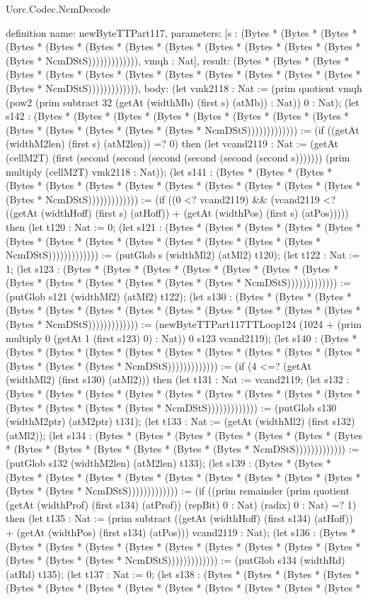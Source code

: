 \begin{lexlean}{Uorc.Codec.NcmDecode}
\begin{semanticmodule}
definition{
  name: newByteTTPart117,
  parameters: [s : (Bytes * (Bytes * (Bytes * (Bytes * (Bytes * (Bytes * (Bytes * (Bytes * (Bytes * (Bytes * (Bytes * (Bytes * (Bytes * NcmDStS))))))))))))), vmqh : Nat],
  result: (Bytes * (Bytes * (Bytes * (Bytes * (Bytes * (Bytes * (Bytes * (Bytes * (Bytes * (Bytes * (Bytes * (Bytes * (Bytes * NcmDStS))))))))))))),
  body: (let vmk2118 : Nat := (prim quotient vmqh (pow2 (prim subtract 32 (getAt (widthMb) (first s) (atMb)) : Nat)) 0 : Nat); (let s142 : (Bytes * (Bytes * (Bytes * (Bytes * (Bytes * (Bytes * (Bytes * (Bytes * (Bytes * (Bytes * (Bytes * (Bytes * (Bytes * NcmDStS))))))))))))) := (if ((getAt (widthM2len) (first s) (atM2len)) =? 0) then (let vcand2119 : Nat := (getAt (cellM2T) (first (second (second (second (second (second (second s))))))) (prim multiply (cellM2T) vmk2118 : Nat)); (let s141 : (Bytes * (Bytes * (Bytes * (Bytes * (Bytes * (Bytes * (Bytes * (Bytes * (Bytes * (Bytes * (Bytes * (Bytes * (Bytes * NcmDStS))))))))))))) := (if ((0 <? vcand2119) && (vcand2119 <? ((getAt (widthHoff) (first s) (atHoff)) + (getAt (widthPos) (first s) (atPos))))) then (let t120 : Nat := 0; (let s121 : (Bytes * (Bytes * (Bytes * (Bytes * (Bytes * (Bytes * (Bytes * (Bytes * (Bytes * (Bytes * (Bytes * (Bytes * (Bytes * NcmDStS))))))))))))) := (putGlob s (widthMl2) (atMl2) t120); (let t122 : Nat := 1; (let s123 : (Bytes * (Bytes * (Bytes * (Bytes * (Bytes * (Bytes * (Bytes * (Bytes * (Bytes * (Bytes * (Bytes * (Bytes * (Bytes * NcmDStS))))))))))))) := (putGlob s121 (widthMf2) (atMf2) t122); (let s130 : (Bytes * (Bytes * (Bytes * (Bytes * (Bytes * (Bytes * (Bytes * (Bytes * (Bytes * (Bytes * (Bytes * (Bytes * (Bytes * NcmDStS))))))))))))) := (newByteTTPart117TTLoop124 (1024 + (prim multiply 0 (getAt 1 (first s123) 0) : Nat)) 0 s123 vcand2119); (let s140 : (Bytes * (Bytes * (Bytes * (Bytes * (Bytes * (Bytes * (Bytes * (Bytes * (Bytes * (Bytes * (Bytes * (Bytes * (Bytes * NcmDStS))))))))))))) := (if (4 <=? (getAt (widthMl2) (first s130) (atMl2))) then (let t131 : Nat := vcand2119; (let s132 : (Bytes * (Bytes * (Bytes * (Bytes * (Bytes * (Bytes * (Bytes * (Bytes * (Bytes * (Bytes * (Bytes * (Bytes * (Bytes * NcmDStS))))))))))))) := (putGlob s130 (widthM2ptr) (atM2ptr) t131); (let t133 : Nat := (getAt (widthMl2) (first s132) (atMl2)); (let s134 : (Bytes * (Bytes * (Bytes * (Bytes * (Bytes * (Bytes * (Bytes * (Bytes * (Bytes * (Bytes * (Bytes * (Bytes * (Bytes * NcmDStS))))))))))))) := (putGlob s132 (widthM2len) (atM2len) t133); (let s139 : (Bytes * (Bytes * (Bytes * (Bytes * (Bytes * (Bytes * (Bytes * (Bytes * (Bytes * (Bytes * (Bytes * (Bytes * (Bytes * NcmDStS))))))))))))) := (if ((prim remainder (prim quotient (getAt (widthProf) (first s134) (atProf)) (repBit) 0 : Nat) (radix) 0 : Nat) =? 1) then (let t135 : Nat := (prim subtract ((getAt (widthHoff) (first s134) (atHoff)) + (getAt (widthPos) (first s134) (atPos))) vcand2119 : Nat); (let s136 : (Bytes * (Bytes * (Bytes * (Bytes * (Bytes * (Bytes * (Bytes * (Bytes * (Bytes * (Bytes * (Bytes * (Bytes * (Bytes * NcmDStS))))))))))))) := (putGlob s134 (widthRd) (atRd) t135); (let t137 : Nat := 0; (let s138 : (Bytes * (Bytes * (Bytes * (Bytes * (Bytes * (Bytes * (Bytes * (Bytes * (Bytes * (Bytes * (Bytes * (Bytes * (Bytes * }
\end{semanticmodule}
\end{lexlean}
